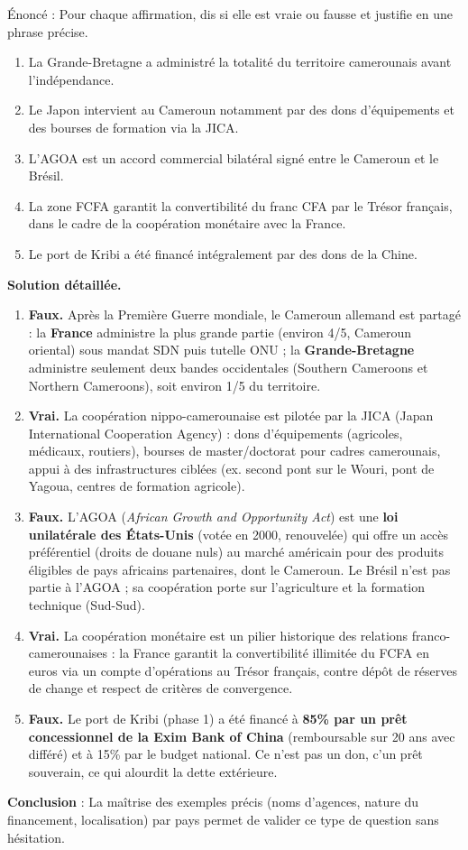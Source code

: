 \documentclass[11pt]{article}
\newcommand{\cle}[1]{{\popxbold\color{popdark}#1}}
\begin{document}
\begin{exoresolu}
Énoncé : Pour chaque affirmation, dis si elle est vraie ou fausse et justifie en une phrase précise.
\begin{enumerate}
\item La Grande-Bretagne a administré la totalité du territoire camerounais avant l'indépendance.
\item Le Japon intervient au Cameroun notamment par des dons d'équipements et des bourses de formation via la JICA.
\item L'AGOA est un accord commercial bilatéral signé entre le Cameroun et le Brésil.
\item La zone FCFA garantit la convertibilité du franc CFA par le Trésor français, dans le cadre de la coopération monétaire avec la France.
\item Le port de Kribi a été financé intégralement par des dons de la Chine.
\end{enumerate}
\tcblower
\textbf{Solution détaillée.}
\begin{enumerate}
\item \textbf{Faux.} Après la Première Guerre mondiale, le Cameroun allemand est partagé : la \textbf{France} administre la plus grande partie (environ 4/5, Cameroun oriental) sous mandat SDN puis tutelle ONU ; la \textbf{Grande-Bretagne} administre seulement deux bandes occidentales (Southern Cameroons et Northern Cameroons), soit environ 1/5 du territoire.
\item \textbf{Vrai.} La coopération nippo-camerounaise est pilotée par la \cle{JICA} (Japan International Cooperation Agency) : dons d'équipements (agricoles, médicaux, routiers), bourses de master/doctorat pour cadres camerounais, appui à des infrastructures ciblées (ex. second pont sur le Wouri, pont de Yagoua, centres de formation agricole).
\item \textbf{Faux.} L'\cle{AGOA} (\emph{African Growth and Opportunity Act}) est une \textbf{loi unilatérale des États-Unis} (votée en 2000, renouvelée) qui offre un accès préférentiel (droits de douane nuls) au marché américain pour des produits éligibles de pays africains partenaires, dont le Cameroun. Le Brésil n'est pas partie à l'AGOA ; sa coopération porte sur l'agriculture et la formation technique (Sud-Sud).
\item \textbf{Vrai.} La coopération monétaire est un pilier historique des relations franco-camerounaises : la France garantit la convertibilité illimitée du FCFA en euros via un compte d'opérations au Trésor français, contre dépôt de réserves de change et respect de critères de convergence.
\item \textbf{Faux.} Le port de Kribi (phase 1) a été financé à \textbf{85\% par un prêt concessionnel de la Exim Bank of China} (remboursable sur 20 ans avec différé) et à 15\% par le budget national. Ce n'est pas un don, c'un prêt souverain, ce qui alourdit la dette extérieure.
\end{enumerate}
\textbf{Conclusion} : La maîtrise des exemples précis (noms d'agences, nature du financement, localisation) par pays permet de valider ce type de question sans hésitation.
\end{exoresolu}
\end{document}
